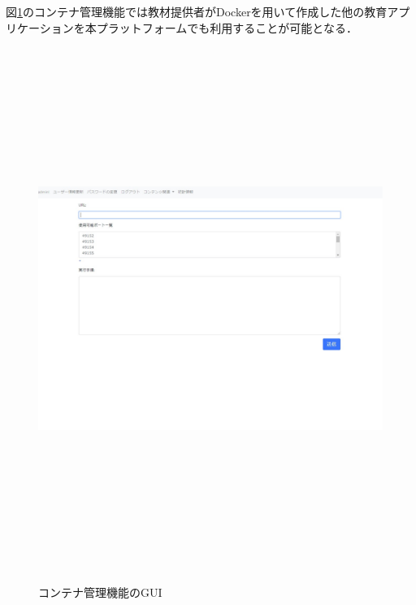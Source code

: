 \newpage
図\ref{kanri}のコンテナ管理機能では教材提供者がDockerを用いて作成した他の教育アプリケーションを本プラットフォームでも利用することが可能となる．
\begin{figure}[htbp]
    \begin{center}
        \includegraphics[width=18cm,height=17cm,keepaspectratio]{container_management-crop.pdf}\\
    \end{center}
    \caption{コンテナ管理機能のGUI}
    \label{kanri}
\end{figure}

